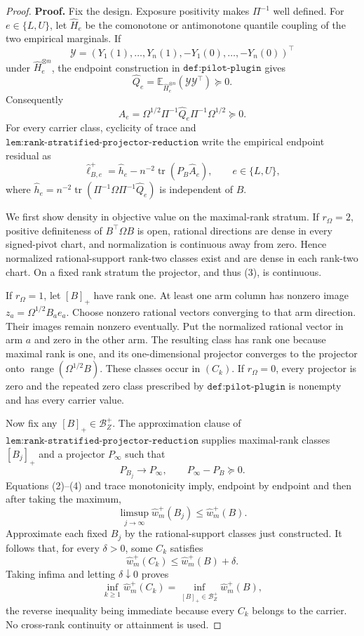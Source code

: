 \documentclass{article}
\begin{document}
\begin{proof}
\textbf{Proof.}
Fix the design.  Exposure positivity makes \(\Pi^{-1}\) well defined.  For \(e\in\{L,U\}\), let \(\widehat H_e\) be the comonotone or antimonotone quantile coupling of the two empirical marginals.  If
\[
\mathcal Y=(Y_1(1),\ldots,Y_n(1),-Y_1(0),\ldots,-Y_n(0))^{\top}
\]
under \(\widehat H_e^{\otimes n}\), the endpoint construction in \(\texttt{def:pilot-plugin}\) gives
\[
\widehat Q_e=\mathbb E_{\widehat H_e^{\otimes n}}(\mathcal Y\mathcal Y^{\top})\succeq0.
\tag{1}
\]
Consequently
\[
\widehat A_e=\Omega^{1/2}\Pi^{-1}\widehat Q_e\Pi^{-1}\Omega^{1/2}\succeq0.
\tag{2}
\]
For every carrier class, cyclicity of trace and \(\texttt{lem:rank-stratified-projector-reduction}\) write the empirical endpoint residual as
\[
\widehat\ell_{B,e}^+
=\widehat h_e-n^{-2}\operatorname{tr}(P_B\widehat A_e),
\qquad e\in\{L,U\},
\tag{3}
\]
where \(\widehat h_e=n^{-2}\operatorname{tr}(\Pi^{-1}\Omega\Pi^{-1}\widehat Q_e)\) is independent of \(B\).

We first show density in objective value on the maximal-rank stratum.  If \(r_\Omega=2\), positive definiteness of \(B^{\top}\Omega B\) is open, rational directions are dense in every signed-pivot chart, and normalization is continuous away from zero.  Hence normalized rational-support rank-two classes exist and are dense in each rank-two chart.  On a fixed rank stratum the projector, and thus (3), is continuous.

If \(r_\Omega=1\), let \([B]_+\) have rank one.  At least one arm column has nonzero image \(z_a=\Omega^{1/2}B_ae_a\).  Choose nonzero rational vectors converging to that arm direction.  Their images remain nonzero eventually.  Put the normalized rational vector in arm \(a\) and zero in the other arm.  The resulting class has rank one because maximal rank is one, and its one-dimensional projector converges to the projector onto \(\operatorname{range}(\Omega^{1/2}B)\).  These classes occur in \((C_k)\).  If \(r_\Omega=0\), every projector is zero and the repeated zero class prescribed by \(\texttt{def:pilot-plugin}\) is nonempty and has every carrier value.

Now fix any \([B]_+\in\mathcal B_Z^+\).  The approximation clause of \(\texttt{lem:rank-stratified-projector-reduction}\) supplies maximal-rank classes \([B_j]_+\) and a projector \(P_\infty\) such that
\[
P_{B_j}\longrightarrow P_\infty,
\qquad P_\infty-P_B\succeq0.
\tag{4}
\]
Equations (2)--(4) and trace monotonicity imply, endpoint by endpoint and then after taking the maximum,
\[
\limsup_{j\to\infty}\widehat w_m^+(B_j)\le\widehat w_m^+(B).
\tag{5}
\]
Approximate each fixed \(B_j\) by the rational-support classes just constructed.  It follows that, for every \(\delta>0\), some \(C_k\) satisfies
\[
\widehat w_m^+(C_k)\le\widehat w_m^+(B)+\delta.
\tag{6}
\]
Taking infima and letting \(\delta\downarrow0\) proves
\[
\inf_{k\ge1}\widehat w_m^+(C_k)
=\inf_{[B]_+\in\mathcal B_Z^+}\widehat w_m^+(B),
\tag{7}
\]
the reverse inequality being immediate because every \(C_k\) belongs to the carrier.  No cross-rank continuity or attainment is used.


\end{proof}
\end{document}
